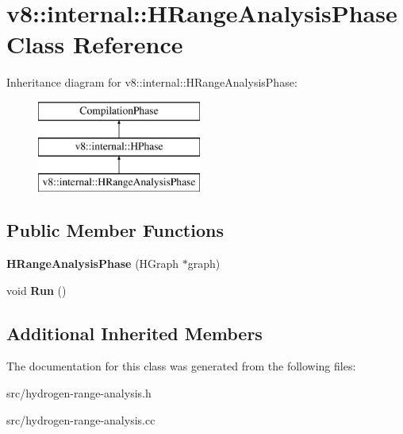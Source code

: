 \hypertarget{classv8_1_1internal_1_1_h_range_analysis_phase}{}\section{v8\+:\+:internal\+:\+:H\+Range\+Analysis\+Phase Class Reference}
\label{classv8_1_1internal_1_1_h_range_analysis_phase}
Inheritance diagram for v8\+:\+:internal\+:\+:H\+Range\+Analysis\+Phase\+:\begin{figure}[H]
\begin{center}
\leavevmode
\includegraphics[height=3.000000cm]{classv8_1_1internal_1_1_h_range_analysis_phase}
\end{center}
\end{figure}
\subsection*{Public Member Functions}
\begin{DoxyCompactItemize}
\item 
\hypertarget{classv8_1_1internal_1_1_h_range_analysis_phase_aedf3f369c4c99b18c01974dbf1be898f}{}{\bfseries H\+Range\+Analysis\+Phase} (H\+Graph $\ast$graph)\label{classv8_1_1internal_1_1_h_range_analysis_phase_aedf3f369c4c99b18c01974dbf1be898f}

\item 
\hypertarget{classv8_1_1internal_1_1_h_range_analysis_phase_a0569cf1f523621c5c967baccc95c12e8}{}void {\bfseries Run} ()\label{classv8_1_1internal_1_1_h_range_analysis_phase_a0569cf1f523621c5c967baccc95c12e8}

\end{DoxyCompactItemize}
\subsection*{Additional Inherited Members}


The documentation for this class was generated from the following files\+:\begin{DoxyCompactItemize}
\item 
src/hydrogen-\/range-\/analysis.\+h\item 
src/hydrogen-\/range-\/analysis.\+cc\end{DoxyCompactItemize}
